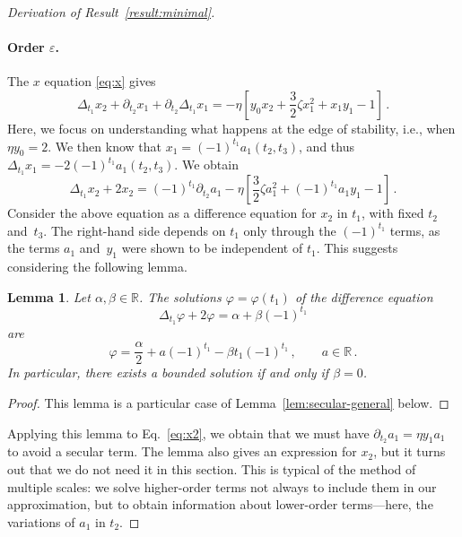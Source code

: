 \documentclass[11pt,english,reqno]{article}
\newcommand{\R}{\mathbb{R}}
\theoremstyle{plain}
\newtheorem{lem}[proposition]{Lemma}
\theoremstyle{definition}
\theoremstyle{remark}
\numberwithin{equation}{section}
\begin{document}
\begin{proof}[Derivation of Result~\ref{result:minimal}]
\paragraph{Order $\varepsilon$.} The $x$ equation \eqref{eq:x} gives
\begin{equation*}
    \Delta_{t_1} x_2 + \partial_{t_2} x_1 + \partial_{t_2} \Delta_{t_1} x_1 = - \eta \left[y_0 x_2 + \frac{3}{2} \zeta x_1^2 +  x_1 y_1 - 1\right] \, .
\end{equation*}
Here, we focus on understanding what happens at the edge of stability, i.e., when $\eta y_0 = 2$. We then know that $x_1 = (-1)^{t_1} a_1(t_2, t_3)$, and thus $\Delta_{t_1} x_1 = -2 (-1)^{t_1} a_1(t_2, t_3)$. We obtain 
\begin{equation}
    \label{eq:x2}
    \Delta_{t_1} x_2 +  2 x_2 = (-1)^{t_1} \partial_{t_2} a_1 - \eta \left[\frac{3}{2} \zeta a_1^2 +  (-1)^{t_1} a_1 y_1 - 1\right] \, .
\end{equation}
Consider the above equation as a difference equation for $x_2$ in $t_1$, with fixed $t_2$ and~$t_3$. The right-hand side depends on $t_1$ only through the $(-1)^{t_1}$ terms, as the terms $a_1$ and~$y_1$ were shown to be independent of $t_1$. This suggests considering the following lemma. 

\begin{lem}
    \label{lem:secular}
    Let $\alpha, \beta \in \R$. The solutions $\varphi = \varphi(t_1)$ of the difference equation
    \begin{equation*}
        \Delta_{t_1} \varphi + 2 \varphi = \alpha + \beta (-1)^{t_1} 
    \end{equation*}
    are 
    \begin{equation*}
        \varphi = \frac{\alpha}{2} + a(-1)^{t_1} - \beta t_1 (-1)^{t_1} \, , \qquad a \in \R \, .
    \end{equation*}
    In particular, there exists a bounded solution if and only if $\beta = 0$.  
\end{lem}

\begin{proof}
    This lemma is a particular case of Lemma~\ref{lem:secular-general} below.
\end{proof}

Applying this lemma to Eq.~\eqref{eq:x2}, we obtain that we must have $\partial_{t_2} a_1 = \eta y_1 a_1$ to avoid a secular term. The lemma also gives an expression for $x_2$, but it turns out that we do not need it in this section. This is typical of the method of multiple scales: we solve higher-order terms not always to include them in our approximation, but to obtain information about lower-order terms---here, the variations of $a_1$ in $t_2$.


\end{proof}
\end{document}
